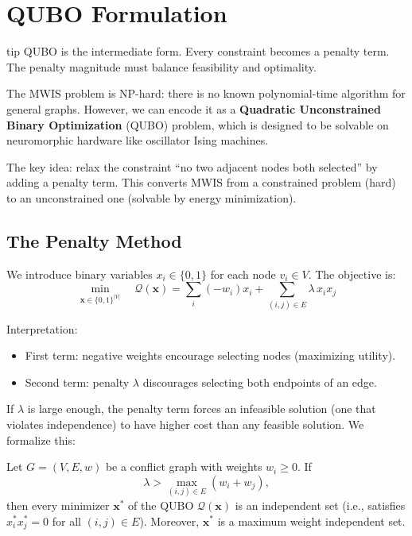 \section{QUBO Formulation}
\begin{block}{tip}
QUBO is the intermediate form. Every constraint becomes a penalty term. The penalty magnitude must balance feasibility and optimality.
\end{block}

\label{sec:qubo-formulation}

The MWIS problem is NP-hard: there is no known polynomial-time algorithm for general graphs. However, we can encode it as a \textbf{Quadratic Unconstrained Binary Optimization} (QUBO) problem, which is designed to be solvable on neuromorphic hardware like oscillator Ising machines.

The key idea: relax the constraint ``no two adjacent nodes both selected'' by adding a penalty term. This converts MWIS from a constrained problem (hard) to an unconstrained one (solvable by energy minimization).

\subsection{The Penalty Method}

We introduce binary variables $x_i \in \{0, 1\}$ for each node $v_i \in V$. The objective is:
\[
\min_{\mathbf{x} \in \{0,1\}^{|V|}} \quad \mathcal{Q}(\mathbf{x}) = \sum_i (-w_i) x_i + \sum_{(i,j) \in E} \lambda \, x_i x_j
\]

Interpretation:
\begin{itemize}
\item First term: negative weights encourage selecting nodes (maximizing utility).
\item Second term: penalty $\lambda$ discourages selecting both endpoints of an edge.
\end{itemize}

If $\lambda$ is large enough, the penalty term forces an infeasible solution (one that violates independence) to have higher cost than any feasible solution. We formalize this:

\begin{theorem}
\label{thm:penalty-bound}
Let $G = (V, E, w)$ be a conflict graph with weights $w_i \geq 0$. If
\[
\lambda > \max_{(i,j) \in E} (w_i + w_j),
\]
then every minimizer $\mathbf{x}^*$ of the QUBO $\mathcal{Q}(\mathbf{x})$ is an independent set (i.e., satisfies $x_i^* x_j^* = 0$ for all $(i,j) \in E$). Moreover, $\mathbf{x}^*$ is a maximum weight independent set.
\end{theorem}

